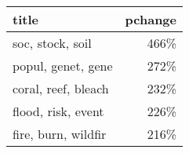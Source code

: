 \begin{tabular}{p{1.2cm}r}
\toprule
               title &  pchange \\
\midrule
    soc, stock, soil &     466\% \\
  popul, genet, gene &     272\% \\
 coral, reef, bleach &     232\% \\
  flood, risk, event &     226\% \\
 fire, burn, wildfir &     216\% \\
\bottomrule
\end{tabular}

